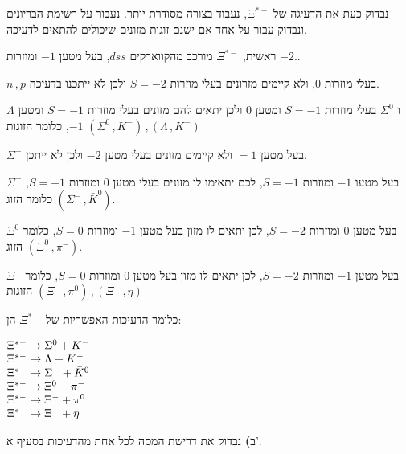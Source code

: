 \documentclass[14pt]{extarticle}
\makeatletter
\newenvironment{lefteqs}{%
    \begin{english}%
    \begin{flushleft}%
    \renewcommand{\arraystretch}{1.3}%
    $\begin{array}{@{}l@{}}%
}{%
    \end{array}$%
    \end{flushleft}%
    \end{english}%
}
\makeatother
\begin{document}
נבדוק כעת את הדעיגה של $\Xi^{*-}$, נעבוד בצורה מסודרת יותר.
נעבור על רשימת הבריונים ונבדוק עבור על אחד אם ישנם זוגות מזונים שיכולים להתאים לדעיכה.

ראשית, $\Xi^{*-}$ מורכב מהקווארקים $dss$, בעל מטען $-1$ ומוזרות $-2$..

$n\, , p$ בעלי מוזרות 0, ולא קיימים מזרונים בעלי מוזרות $S=-2$ ולכן לא ייתכנו בדעיכה.

$\Lambda$ ו $\Sigma^0$ בעלי מוזרות $S=-1$ ומטען $0$ ולכן יתאים להם מזונים בעלי מוזרות $S=-1$ ומטען $-1$, כלומר הזוגות $(\Sigma^0 \, , K^-)  \, , (\Lambda \, , K^-)$

$\Sigma^+$ בעל מטען $=1$ ולא קיימים מזונים בעלי מטען $-2$ ולכן לא ייתכן.

$\Sigma^-$ בעל מטעו $-1$ ומוזרות $S=-1$, לכם יתאימו לו מזונים בעלי מטען $0$ ומוזרות $S=-1$, כלומר הזוג $(\Sigma^- \, , \bar{K}^0)$.

$\Xi^0$ בעל מטען $0$ ומוזרות $S=-2$, לכן יתאים לו מזון בעל מטען $-1$ ומוזרות $S=0$, כלומר הזוג $(\Xi^0 \, , \pi^-)$.

$\Xi^-$ בעל מטען $-1$ ומוזרות $S=-2$, לכן יתאים לו מזון בעל מטען $0$ ומוזרות $S=0$, כלומר הזוגות $(\Xi^- \, , \pi^0) \, , (\Xi^- \, , \eta)$

כלומר הדעיכות האפשריות של $\Xi^{*-}$ הן:
\begin{lefteqs}
    \Xi^{*-} \to \Sigma^0 + K^- \\
    \Xi^{*-} \to \Lambda + K^- \\
    \Xi^{*-} \to \Sigma^- + \bar{K}^0 \\
    \Xi^{*-} \to \Xi^0 + \pi^- \\
    \Xi^{*-} \to \Xi^- + \pi^0 \\
    \Xi^{*-} \to \Xi^- + \eta
\end{lefteqs}

\textbf{ב)}
נבדוק את דרישת המסה לכל אחת מהדעיכות בסעיף א'.
\end{document}
